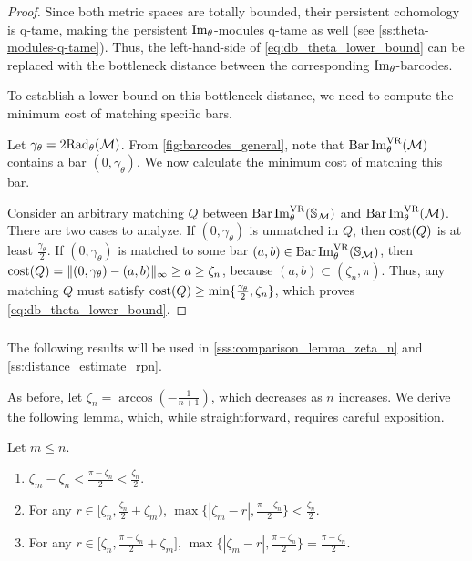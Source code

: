 \begin{proof}
    Since both metric spaces are totally bounded, their persistent cohomology is q-tame, making the persistent $\operatorname{Im}_\theta$-modules q-tame as well (see \cref{ss:theta-modules-q-tame}).
    Thus, the left-hand-side of \cref{eq:db_theta_lower_bound} can be replaced with the bottleneck distance between the corresponding $\operatorname{Im}_\theta$-barcodes.

    To establish a lower bound on this bottleneck distance, we need to compute the minimum cost of matching specific bars.

    Let \( \gamma_\theta = 2\mathrm{Rad}_{\theta}(\mathcal{M}) \).
    From \cref{fig:barcodes_general}, note that \( \operatorname{Bar}\operatorname{Im}_{\theta}^{\mathrm{VR}} (\mathcal{M}) \) contains a bar \( (0, \gamma_\theta) \).
    We now calculate the minimum cost of matching this bar.

    Consider an arbitrary matching \( Q \) between \( \operatorname{Bar}\operatorname{Im}_{\theta}^{\mathrm{VR}} (\mathbb{S}_{\mathcal{M}}) \) and \( \operatorname{Bar}\operatorname{Im}_{\theta}^{\mathrm{VR}} (\mathcal{M}) \).
    There are two cases to analyze.
	If $(0,\gamma_\theta )$ is unmatched in $Q$, then $\mathrm{cost}(Q)$ is at least $ \tfrac{\gamma_\theta }{2}$.
	If $(0,\gamma_\theta )$ is matched to some bar $(a,b) \in \operatorname{Bar}\operatorname{Im}_{\theta}^{\mathrm{VR}} (\mathbb{S}_{\mathcal{M}})$, then
	$\mathrm{cost}(Q) =  \|(0,\gamma_\theta ) - (a,b)\|_\infty \geq a \geq \zeta_n$, because $(a,b) \subset (\zeta_n, \pi)$.
	Thus, any matching $Q$ must satisfy $\mathrm{cost}(Q) \geq \min\{\tfrac{\gamma_\theta }{2}, \zeta_n\}$, which proves \cref{eq:db_theta_lower_bound}.
\end{proof}


\subsubsection{}
\label{sss:comparison_lemma}

The following results will be used in \cref{sss:comparison_lemma_zeta_n} and \cref{ss:distance_estimate_rpn}.

As before, let $\zeta_n = \arccos{(-\tfrac{1}{n+1})}$, which decreases as $n$ increases.
We derive the following lemma, which, while straightforward, requires careful exposition.

\medskip\lemma
Let $m \leq n$.
\begin{enumerate}
    \item \(\zeta_m - \zeta_n < \tfrac{\pi - \zeta_n}{2} < \tfrac{\zeta_n}{2}.\)

    \item For any $r \in \big[\zeta_n, \tfrac{\zeta_n}{2}+\zeta_m\big)$, $\max\big\{|\zeta_m  - r |, \tfrac{\pi - \zeta_n}{2}\big\} < \tfrac{\zeta_n}{2}$.

    \item For any $r \in \big[\zeta_n, \tfrac{\pi - \zeta_n}{2} + \zeta_m\big]$, $\max\{|\zeta_m  - r |, \tfrac{\pi - \zeta_n}{2}\} = \tfrac{\pi - \zeta_n}{2}$.
\end{enumerate}



